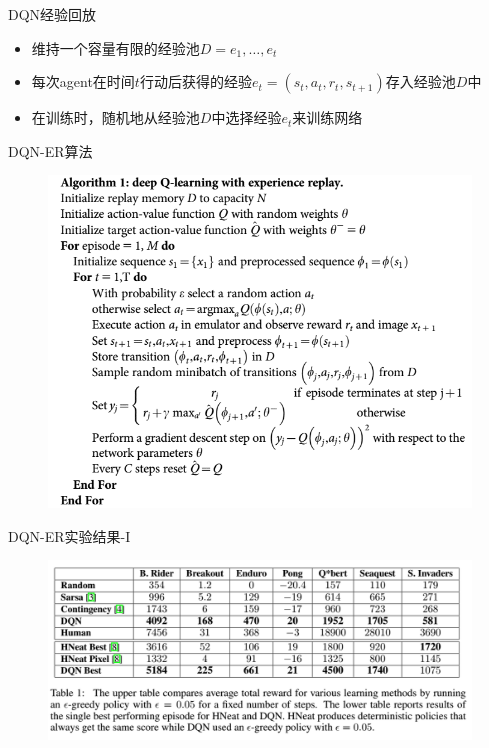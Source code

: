 \documentclass[10pt]{beamer}
\begin{document}
	\begin{frame}{DQN}{经验回放}
		\begin{itemize}
			\item<2-> 维持一个容量有限的经验池$D=e_1,\dots,e_t$
			
			\item<3-> 每次agent在时间$t$行动后获得的经验$e_t = (s_t,a_t,r_t,s_{t+1})$存入经验池$D$中
			
			\item<4-> 在训练时，随机地从经验池$D$中选择经验$e_t$来训练网络
			
		\end{itemize}
	\end{frame}
	
	\begin{frame}{DQN-ER}{算法}
		\begin{figure}
			\centering
			\includegraphics[width=0.9\linewidth]{pictures/drqn-alg}
		\end{figure}
	\end{frame}

	\begin{frame}{DQN-ER}{实验结果-I}
		\begin{figure}
			\centering
			\includegraphics[width=0.9\linewidth]{pictures/drqn-expr-result-tab}
		\end{figure}	
	\end{frame}
\end{document}
